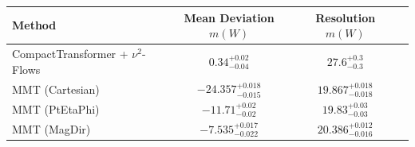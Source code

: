     \begin{tabular}{lccc}
        \toprule
        Method & Mean Deviation $m(W)$ & Resolution $m(W)$ \\
        \midrule
        CompactTransformer + $\nu^2$-Flows & $0.34^{+0.02}_{-0.04}$ & $27.6^{+0.3}_{-0.3}$ \\
        MMT (Cartesian) & $-24.357^{+0.018}_{-0.015}$ & $19.867^{+0.018}_{-0.018}$ \\
        MMT (PtEtaPhi) & $-11.71^{+0.02}_{-0.02}$ & $19.83^{+0.03}_{-0.03}$ \\
        MMT (MagDir) & $-7.535^{+0.017}_{-0.022}$ & $20.386^{+0.012}_{-0.016}$ \\
        \bottomrule
    \end{tabular}